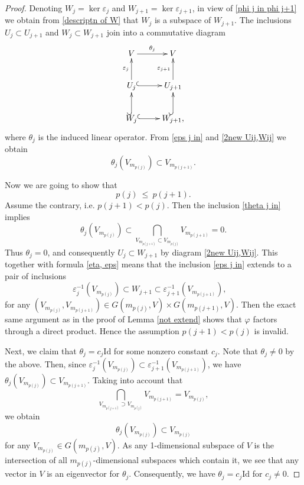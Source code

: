 \documentclass[12pt]{amsart}
\renewcommand{\phi}{\varphi}
\theoremstyle{definition}
\begin{document}
\begin{proof}
Denoting $W_j=\ker\varepsilon_j$ and $W_{j+1}=\ker\varepsilon
_{j+1}$, in view of \eqref{phi j in phi j+1} we obtain from 
\eqref{descriptn  of W} that $W_j$ is a subspace of $W_{j+1}$. 
The inclusions $U_j\subset U_{j+1}$ and $W_j\subset W_{j+1}$ join into a commutative diagram
\begin{equation}\label{2new Uij,Wij}
\xymatrix{
V\ar[r]^-{\theta_j} & V \\
U_j\ar@{^{(}->}[r]\ar[u]^-{\varepsilon_j} & 
U_{j+1}\ar[u]^-{\varepsilon_{j+1}}\\
W_j\ar@{^{(}->}[r]\ar@{^{(}->}[u] & W_{j+1},\ar@{^{(}->}[u]}
\end{equation}
where $\theta_j$ is the induced linear operator. From 
\eqref{eps j in} and \eqref{2new Uij,Wij} we obtain
\begin{equation}\label{theta j in}
\theta_j(V_{m_{p(j)}})\subset V_{m_{p(j+1)}}.
\end{equation}

Now we are going to show that 
\begin{equation*}\label{p(j)le p(j+1)}
p(j)\ \le\ p(j+1). 
\end{equation*}
Assume the contrary, i.e. $p(j+1)<p(j)$. Then the inclusion
\eqref{theta j in} implies
$$
\theta_j(V_{m_{p(j)}}) \subset \underset{V_{m_{p(j+1)}}\subset 
V_{m_{p(j)}}}{\bigcap} V_{m_{p(j+1)}}=0.
$$
Thus $\theta_j=0$, and consequently $U_j\subset W_{j+1}$ by
diagram \eqref{2new Uij,Wij}. This together with formula  
\eqref{eta, eps} means that the inclusion \eqref{eps j in}
extends to a pair of inclusions
\begin{equation*}\label{eps j in W}
\varepsilon_j^{-1}(V_{m_{p(j)}})\subset W_{j+1}\subset
\varepsilon_{j+1}^{-1}(V_{m_{p(j+1)}}),\ \ \ \ 
\end{equation*}
for any $(V_{m_{p(j)}},V_{m_{p(j+1)}})\in G(m_{p(j)},V)\times 
G(m_{p(j+1)},V)$. Then the exact same argument as in the 
proof of Lemma \ref{not extend} shows that $\phi$ factors 
through a direct product. Hence the assumption $p(j+1)<p(j)$ 
is invalid.

Next, we claim that $\theta_j=c_j\mathrm{Id}$ for some nonzero 
constant $c_j$. Note that $\theta_j\ne0$ by the above. Then, 
since $\varepsilon_j^{-1}(V_{m_{p(j)}})\subset\varepsilon_{j+1}
^{-1}(V_{m_{p(j+1)}})$,
we have $\theta_j(V_{m_{p(j)}})\subset V_{m_{p(j+1)}}$. Taking
into account that 
$$\underset{V_{m_{p(j+1)}}\supset 
V_{m_{p(j)}}}{\bigcap}V_{m_{p(j+1)}}=V_{m_{p(j)}},$$ 
we obtain
\begin{equation*}\label{theta(...)in}
\theta_j(V_{m_{p(j)}})\subset V_{m_{p(j)}}
\end{equation*}
for any $V_{m_{p(j)}}\in G(m_{p(j)},V)$. As any 1-dimensional 
subspace of $V$ is the intersection of all 
$m_{p(j)}$-dimensional subspaces which contain it, we see that
any vector in $V$ is an eigenvector for $\theta_j$. 
Consequently, we have $\theta_j=c_j\mathrm{Id}$ for $c_j\ne0$.


\end{proof}
\end{document}
